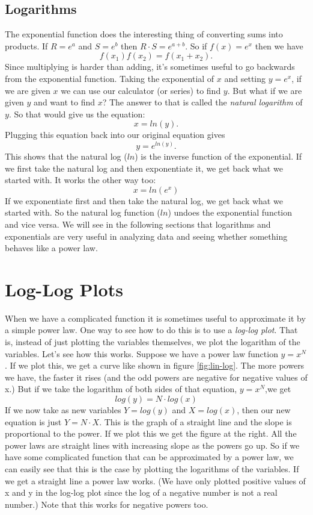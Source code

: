 \subsection*{Logarithms}
The exponential function does the interesting thing of converting sums into products.
If $R = e^{a}$ and $S = e^{b}$ then $R \cdot S = e^{a+b}$.
So if $f(x) = e^{x}$ then we have
\[ f(x_{1})f(x_{2}) = f(x_{1} + x_{2}). \]
Since multiplying is harder than adding, it's sometimes useful to go backwards from the exponential function. 
Taking the exponential of $x$ and setting $y = e^{x}$, if we are given $x$ we can use our calculator (or series) to find $y$.
But what if we are given $y$ and want to find $x$?
The answer to that is called the \emph{natural logarithm} of $y$.
So that would give us the equation:
\[ x = ln(y). \]
Plugging this equation back into our original equation gives
\[ y = e^{ln(y)}. \]
This shows that the natural log ($ln$) is the inverse function of the exponential.
If we first take the natural log and then exponentiate it, we get back what we started with.
It works the other way too:
\[ x = ln(e^{x}) \]
If we exponentiate first and then take the natural log, we get back what we started with.
So the natural log function ($ln$) undoes the exponential function and vice versa.
We will see in the following sections that logarithms and exponentials are very useful in analyzing data and seeing whether something behaves like a power law. 

\section{Log-Log Plots}
When we have a complicated function it is sometimes useful to approximate it by a simple power law.
One way to see how to do this is to use a \emph{log-log plot}.
That is, instead of just plotting the variables themselves, we plot the logarithm of the variables.
Let's see how this works.
Suppose we have a power law function $y = x^{N}$.
If we plot this, we get a curve like shown in figure \ref{fig:lin-log}.
The more powers we have, the faster it rises (and the odd powers are negative for negative values of x.)
But if we take the logarithm of both sides of that equation, $y = x^{N}$,we get
\[ log(y)=N \cdot log(x) \] 
If we now take as new variables $Y = log(y)$ and $X = log(x)$, then our new equation is just $Y = N \cdot X$.
This is the graph of a straight line and the slope is proportional to the power.
If we plot this we get the figure at the right.
All the power laws are straight lines with increasing slope as the powers go up.
So if we have some complicated function that can be approximated by a power law, we can easily see that this is the case by plotting the logarithms of the variables. 
If we get a straight line a power law works. 
(We have only plotted positive values of x and y in the log-log plot since the log of a negative number is not a real number.)
Note that this works for negative powers too. 

